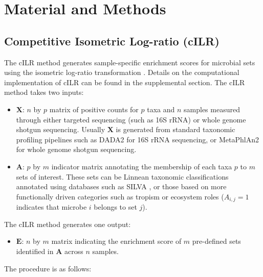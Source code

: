 \documentclass[10pt,letterpaper]{article}
\begin{document}
\section{Material and Methods} \label{Methods}
\subsection{Competitive Isometric Log-ratio (cILR)}
The cILR method generates sample-specific enrichment scores for microbial sets using the isometric log-ratio transformation \cite{egozcue2003}. Details on the computational implementation of cILR can be found in the supplemental section. The cILR method takes two inputs:  
\begin{itemize}
    \item $\mathbf{X}$: $n$ by $p$ matrix of positive counts for $p$ taxa and $n$ samples measured through either targeted sequencing (such as 16S rRNA) or whole genome shotgun sequencing. Usually $\mathbf{X}$ is generated from standard taxonomic profiling pipelines such as DADA2 \cite{callahan2016} for 16S rRNA sequencing, or MetaPhlAn2 \cite{truong2015} for whole genome shotgun sequencing. 
    \item $\mathbf{A}$: $p$ by $m$ indicator matrix annotating the membership of each taxa $p$ to $m$ sets of interest. These sets can be Linnean taxonomic classifications annotated using databases such as SILVA \cite{quast2013}, or those based on more functionally driven categories such as tropism or ecosystem roles ($A_{i,j} = 1$ indicates that microbe $i$ belongs to set $j$). 
\end{itemize}
The cILR method generates one output:  
\begin{itemize} 
    \item $\mathbf{E}$: $n$ by $m$ matrix indicating the enrichment score of $m$ pre-defined sets identified in $\mathbf{A}$ across $n$ samples. 
\end{itemize}
The procedure is as follows:  
\end{document}
